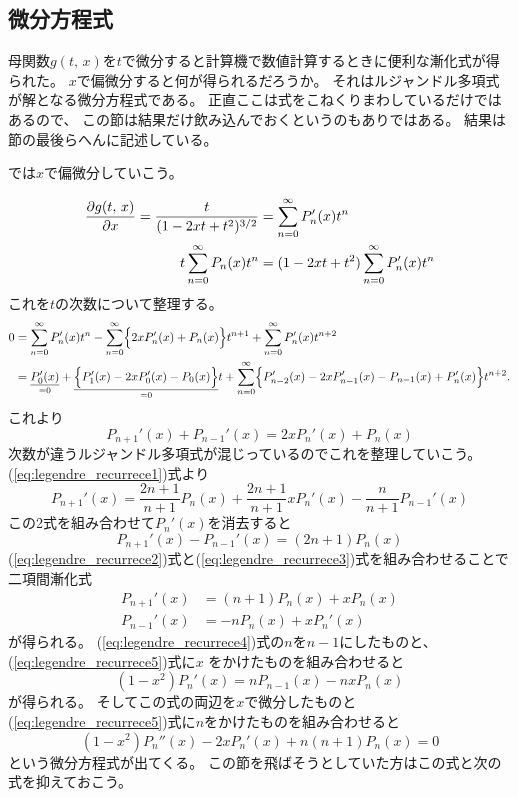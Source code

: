 \documentclass[../../master.tex]{subfiles}
\begin{document}
\subsection{微分方程式}
母関数\(g(t,\,x)\)を\(t\)で微分すると計算機で数値計算するときに便利な漸化式が得られた。
\(x\)で偏微分すると何が得られるだろうか。
それはルジャンドル多項式が解となる微分方程式である。
正直ここは式をこねくりまわしているだけではあるので、
この節は結果だけ飲み込んでおくというのもありではある。
結果は節の最後らへんに記述している。

では\(x\)で偏微分していこう。

\begin{align}
	\pdv{g(t,\,x)}{x} = \frac{t}{(1-2xt+t^2)^{3/2}} & = \sum_{n=0}^{\infty} P_n'(x) t^n            \\
	t\sum_{n=0}^{\infty} P_n(x) t^n                 & = (1-2xt+t^2)\sum_{n=0}^{\infty} P_n'(x) t^n
\end{align}
これを\(t\)の次数について整理する。
\begin{align}
	0 & = \sum_{n=0}^{\infty} P_n'(x)t^n - \sum_{n=0}^{\infty} \Bigl\{2xP_n'(x)+P_n(x)\Bigr\}t^{n+1} + \sum_{n=0}^{\infty}P_n'(x) t^{n+2} \\
	  & = \underset{=0}{\underline{P_0'(x)}}
	+\underset{=0}{\underline{\Bigl\{P_1'(x)-2xP_0'(x)-P_0(x)\Bigr\}}}t
	+\sum_{n=0}^{\infty}\Bigl\{P_{n-2}'(x)-2xP_{n-1}'(x)-P_{n-1}(x) +P_n'(x) \Bigr\}t^{n+2}.
\end{align}
これより
\begin{equation}
	P_{n+1}'(x)+P_{n-1}'(x) = 2xP_n'(x) + P_n(x) \label{eq:legendre_recurrece2}
\end{equation}
次数が違うルジャンドル多項式が混じっているのでこれを整理していこう。
(\ref{eq:legendre_recurrece1})式より
\begin{equation}
	P_{n+1}'(x) = \frac{2n+1}{n+1}P_n(x)+\frac{2n+1}{n+1}xP_n'(x) - \frac{n}{n+1}P_{n-1}'(x)
\end{equation}
この2式を組み合わせて\(P_n'(x)\)を消去すると
\begin{equation}
	P_{n+1}'(x)-P_{n-1}'(x) = (2n+1) P_n(x) \label{eq:legendre_recurrece3}
\end{equation}
(\ref{eq:legendre_recurrece2})式と(\ref{eq:legendre_recurrece3})式を組み合わせることで
二項間漸化式
\begin{align}
	P_{n+1}'(x) & = (n+1)P_n(x) + xP_n(x)\label{eq:legendre_recurrece4} \\
	P_{n-1}'(x) & = -nP_n(x)+xP_n'(x)\label{eq:legendre_recurrece5}
\end{align}
が得られる。
(\ref{eq:legendre_recurrece4})式の\(n\)を\(n-1\)にしたものと、
(\ref{eq:legendre_recurrece5})式に\(x\) をかけたものを組み合わせると
\begin{equation}
	(1-x^2)P_n'(x)= nP_{n-1}(x)-nxP_n(x)
\end{equation}
が得られる。
そしてこの式の両辺を\(x\)で微分したものと
(\ref{eq:legendre_recurrece5})式に\(n\)をかけたものを組み合わせると
\begin{equation}
	(1-x^2)P_n''(x)-2xP_n'(x)+n(n+1)P_n(x) = 0 \label{eq:legendre_dif_eq1}
\end{equation}
という微分方程式が出てくる。
この節を飛ばそうとしていた方はこの式と次の式を抑えておこう。
\end{document}
